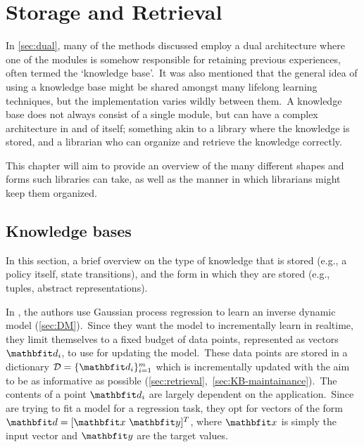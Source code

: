 \chapter{Storage and Retrieval}\label{ch:storage}
In \cref{sec:dual}, many of the methods discussed employ a dual architecture where one of the modules is somehow responsible for retaining previous experiences, often termed the `knowledge base'.\ It was also mentioned that the general idea of using a knowledge base might be shared amongst many lifelong learning techniques, but the implementation varies wildly between them.\ A knowledge base does not always consist of a single module, but can have a complex architecture in and of itself; something akin to a library where the knowledge is stored, and a librarian who can organize and retrieve the knowledge correctly.

This chapter will aim to provide an overview of the many different shapes and forms such libraries can take, as well as the manner in which librarians might keep them organized.



\section{Knowledge bases}\label{sec:KB}
In this section, a brief overview on the type of knowledge that is stored (e.g., a policy itself, state transitions), and the form in which they are stored (e.g., tuples, abstract representations).

In \textcite{Nguyen2011}, the authors use Gaussian process regression to learn an inverse dynamic model (\cref{sec:DM}).\ Since they want the model to incrementally learn in realtime, they limit themselves to a fixed budget of data points, represented as vectors $\bvec{d}_i$, to use for updating the model.\ These data points are stored in a dictionary $\mathcal{D} = \{\bvec{d}_{i}\}_{i=1}^m$ which is incrementally updated with the aim to be as informative as possible (\cref{sec:retrieval},~\ref{sec:KB-maintainance}).\ The contents of a point $\bvec{d}_i$ are largely dependent on the application.\ Since \textcite{Nguyen2011} are trying to fit a model for a regression task, they opt for vectors of the form $\bvec{d} = [\bvec{x}\ \bvec{y}]^T$, where $\bvec{x}$ is simply the input vector and $\bvec{y}$ are the target values.


